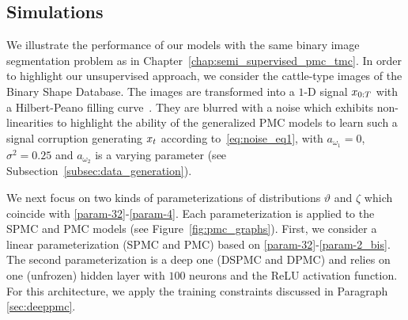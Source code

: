 \subsection{Simulations}
\label{sec:pmc}
We illustrate the performance of our models with the same 
binary image segmentation problem as in Chapter~\ref{chap:semi_supervised_pmc_tmc}.
In order to highlight our unsupervised approach,
we consider the cattle-type images of the Binary Shape Database. %
The images are transformed into a $1$-D signal $x_{0:T}$ with a Hilbert-Peano
filling curve~\citep{sagan2012space}.
They are  blurred with a noise which exhibits non-linearities 
to highlight the ability of the generalized PMC models to 
learn such a signal corruption
generating $x_t$ according to~\eqref{eq:noise_eq1}, with
$a_{\omega_1}=0$, $\sigma^2=0.25$ and $a_{\omega_2}$ is a varying parameter 
(see Subsection~\ref{subsec:data_generation}). 

We next focus on two kinds of parameterizations of distributions $\vartheta$ and
$\zeta$ which coincide with \eqref{param-32}-\eqref{param-4}. Each
parameterization is applied to the SPMC and PMC models (see Figure~\ref{fig:pmc_graphs}). 
First, we consider a linear parameterization (SPMC and PMC) based
on \eqref{param-32}-\eqref{param-2_bis}. The second parameterization is a deep
one (DSPMC and DPMC) and relies on one (unfrozen) hidden layer with $100$
neurons and the ReLU activation function. For this architecture, we apply the
training constraints discussed in Paragraph \ref{sec:deeppmc}.

